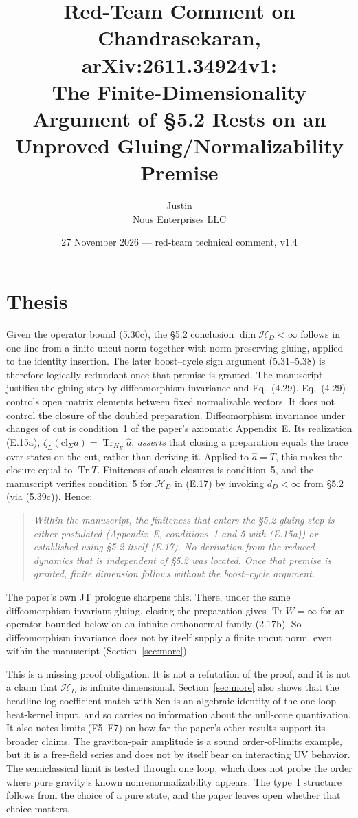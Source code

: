 \documentclass[11pt]{article}
\title{Red-Team Comment on Chandrasekaran, arXiv:2611.34924v1:\\The Finite-Dimensionality Argument of \S5.2 Rests on an Unproved Gluing/Normalizability Premise}
\author{Justin\\\small Nous Enterprises LLC}
\date{27 November 2026 --- red-team technical comment, v1.4}
\theoremstyle{remark}
\newcommand{\Tr}{\operatorname{Tr}}
\newcommand{\HD}{\mathcal H_D}
\begin{document}
\maketitle

\section*{Thesis}
Given the operator bound (5.30c), the \S5.2 conclusion $\dim\HD<\infty$ follows in one
line from a finite uncut norm together with norm-preserving gluing, applied to the
identity insertion. The later boost--cycle sign argument (5.31--5.38) is therefore
logically redundant once that premise is granted. The manuscript justifies the gluing
step by diffeomorphism invariance and Eq.~(4.29). Eq.~(4.29) controls open matrix
elements between fixed normalizable vectors. It does not control the closure of the
doubled preparation. Diffeomorphism invariance under changes of cut is condition~1 of
the paper's axiomatic Appendix~E. Its realization (E.15a),
$\zeta_L(\mathrm{cl}_\Sigma a)=\Tr_{H_\Sigma}\hat a$, \emph{asserts} that closing a
preparation equals the trace over states on the cut, rather than deriving it. Applied to
$\hat a=T$, this makes the closure equal to $\Tr T$. Finiteness of such closures is
condition~5, and the manuscript verifies condition~5 for $\HD$ in (E.17) by invoking
$d_D<\infty$ from \S5.2 (via (5.39c)). Hence:

\begin{quote}
\emph{Within the manuscript, the finiteness that enters the \S5.2 gluing step is either
postulated (Appendix~E, conditions~1 and 5 with (E.15a)) or established using \S5.2
itself (E.17). No derivation from the reduced dynamics that is independent of \S5.2 was
located. Once that premise is granted, finite dimension follows without the
boost--cycle argument.}
\end{quote}

The paper's own JT prologue sharpens this. There, under the same diffeomorphism-invariant
gluing, closing the preparation gives $\Tr W=\infty$ for an operator bounded below on an
infinite orthonormal family (2.17b). So diffeomorphism invariance does not by itself
supply a finite uncut norm, even within the manuscript (Section~\ref{sec:more}).

This is a missing proof obligation. It is not a refutation of the proof, and it is not
a claim that $\HD$ is infinite dimensional. Section~\ref{sec:more} also shows that the
headline log-coefficient match with Sen is an algebraic identity of the one-loop
heat-kernel input, and so carries no information about the null-cone quantization. It
also notes limits (F5--F7) on how far the paper's other results support its broader
claims. The graviton-pair amplitude is a sound order-of-limits example, but it is a
free-field series and does not by itself bear on interacting UV behavior. The
semiclassical limit is tested through one loop, which does not probe the order where
pure gravity's known nonrenormalizability appears. The type~I structure follows from the
choice of a pure state, and the paper leaves open whether that choice matters.
\end{document}
